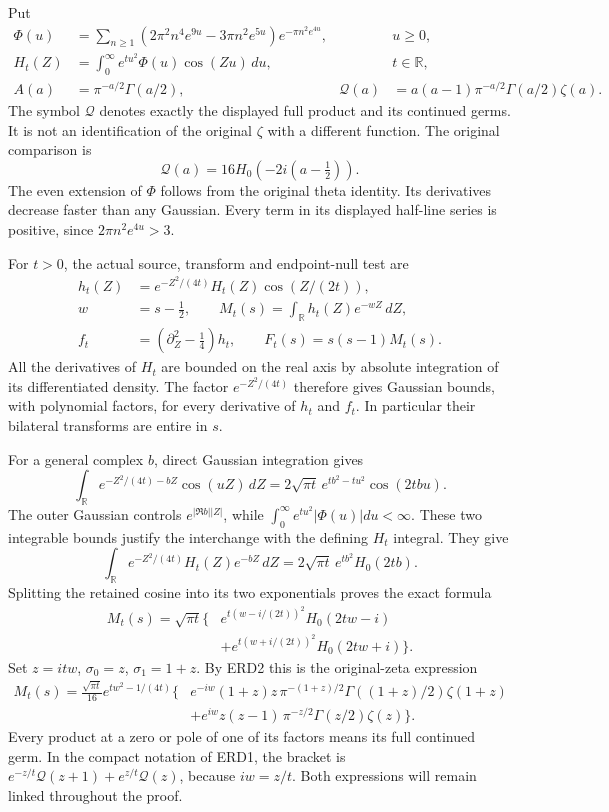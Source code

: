 \documentclass[
  10pt,
  a4paper,
]{article}
\begin{document}
Put \[
 \begin{aligned}
 \Phi(u)&=\sum_{n\ge1}
       (2\pi^2n^4e^{9u}-3\pi n^2e^{5u})e^{-\pi n^2e^{4u}},
       &&u\ge0,\\
 H_t(Z)&=\int_0^\infty e^{tu^2}\Phi(u)\cos(Zu)\,du,
       &&t\in\mathbb R,\\
 A(a)&=\pi^{-a/2}\Gamma(a/2),&
 \mathcal Q(a)&=a(a-1)\pi^{-a/2}\Gamma(a/2)\zeta(a).
 \end{aligned}
 \tag{ERD1}
\] The symbol \(\mathcal Q\) denotes exactly the displayed full product
and its continued germs. It is not an identification of the original
\(\zeta\) with a different function. The original comparison is \[
 \mathcal Q(a)=16H_0(-2i(a-\tfrac12)).
 \tag{ERD2}
\] The even extension of \(\Phi\) follows from the original theta
identity. Its derivatives decrease faster than any Gaussian. Every term
in its displayed half-line series is positive, since
\(2\pi n^2e^{4u}>3\).

For \(t>0\), the actual source, transform and endpoint-null test are \[
 \begin{aligned}
 h_t(Z)&=e^{-Z^2/(4t)}H_t(Z)\cos(Z/(2t)),\\
 w&=s-\tfrac12,\qquad
 M_t(s)=\int_{\mathbb R}h_t(Z)e^{-wZ}\,dZ,\\
 f_t&=(\partial_Z^2-\tfrac14)h_t,\qquad
 F_t(s)=s(s-1)M_t(s).
 \end{aligned}
 \tag{ERD3}
\] All the derivatives of \(H_t\) are bounded on the real axis by
absolute integration of its differentiated density. The factor
\(e^{-Z^2/(4t)}\) therefore gives Gaussian bounds, with polynomial
factors, for every derivative of \(h_t\) and \(f_t\). In particular
their bilateral transforms are entire in \(s\).

For a general complex \(b\), direct Gaussian integration gives \[
 \int_{\mathbb R}e^{-Z^2/(4t)-bZ}\cos(uZ)\,dZ
       =2\sqrt{\pi t}\,e^{tb^2-tu^2}\cos(2tbu).
\] The outer Gaussian controls \(e^{|\Re b||Z|}\), while
\(\int_0^\infty e^{tu^2}|\Phi(u)|du<\infty\). These two integrable
bounds justify the interchange with the defining \(H_t\) integral. They
give \[
 \int_{\mathbb R}e^{-Z^2/(4t)}H_t(Z)e^{-bZ}\,dZ
       =2\sqrt{\pi t}\,e^{tb^2}H_0(2tb).
\] Splitting the retained cosine into its two exponentials proves the
exact formula \[
 \begin{aligned}
 M_t(s)=\sqrt{\pi t}\big\{&
 e^{t(w-i/(2t))^2}H_0(2tw-i)\\
 &+e^{t(w+i/(2t))^2}H_0(2tw+i)\big\}.
 \end{aligned}
 \tag{ERD4}
\] Set \(z=itw\), \(\sigma_0=z\), \(\sigma_1=1+z\). By ERD2 this is the
original-zeta expression \[
 \boxed{\begin{aligned}
 M_t(s)=\frac{\sqrt{\pi t}}{16}e^{tw^2-1/(4t)}
 \big\{&
 e^{-iw}(1+z)z\,\pi^{-(1+z)/2}
          \Gamma((1+z)/2)\zeta(1+z)\\
 &+e^{iw}z(z-1)\,\pi^{-z/2}
          \Gamma(z/2)\zeta(z)\big\}.
 \end{aligned}}
 \tag{ERD5}
\] Every product at a zero or pole of one of its factors means its full
continued germ. In the compact notation of ERD1, the bracket is
\(e^{-z/t}\mathcal Q(z+1)+e^{z/t}\mathcal Q(z)\), because \(iw=z/t\).
Both expressions will remain linked throughout the proof.
\end{document}
